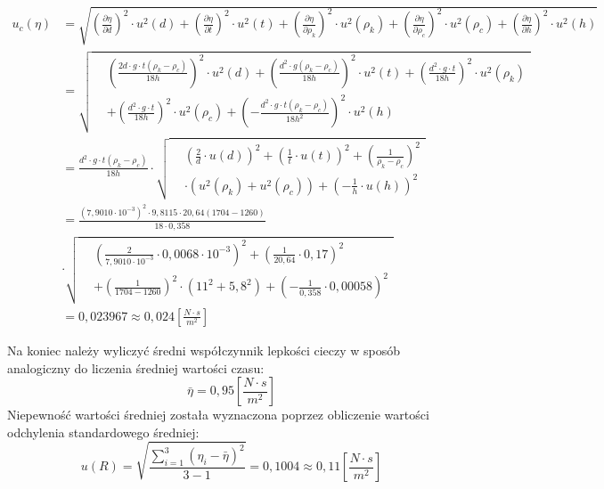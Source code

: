 \documentclass[polish, 11pt, a4paper]{article}
\begin{document}
		\begin{align*}
			u_c(\eta)	&=\sqrt{\left(\frac{\partial \eta}{\partial d}\right)^2\cdot u^2(d)
							+\left(\frac{\partial \eta}{\partial t}\right)^2\cdot u^2(t)
							+\left(\frac{\partial \eta}{\partial \rho_k}\right)^2\cdot u^2(\rho_k)
							+\left(\frac{\partial \eta}{\partial \rho_c}\right)^2\cdot u^2(\rho_c)
							+\left(\frac{\partial \eta}{\partial h}\right)^2\cdot u^2(h)}\\[10pt]
						&=\sqrt{
							\begin{aligned}
							&\left(\frac{2d\cdot g\cdot t(\rho_k-\rho_c)}{18h}\right)^2\cdot u^2(d)
								+\left(\frac{d^2\cdot g(\rho_k-\rho_c)}{18h}\right)^2\cdot u^2(t)
								+\left(\frac{d^2\cdot g\cdot t}{18h}\right)^2\cdot u^2(\rho_k)\\
							&+\left(\frac{d^2\cdot g\cdot t}{18h}\right)^2\cdot u^2(\rho_c)
								+\left(-\frac{d^2\cdot g\cdot t(\rho_k-\rho_c)}{18h^2}\right)^2\cdot u^2(h)
							\end{aligned}
						}\\[10pt]
						&=\frac{d^2\cdot g\cdot t(\rho_k-\rho_c)}{18h}\cdot
							\sqrt{
								\begin{aligned}
								&\left(\frac{2}{d}\cdot u(d)\right)^2 + \left(\frac{1}{t}\cdot u(t)\right)^2 + \left(\frac{1}{\rho_k-\rho_c}\right)^2\\
								&\cdot\left(u^2(\rho_k)+u^2(\rho_c)\right) + \left(-\frac{1}{h}\cdot u(h)\right)^2
								\end{aligned}
							}\\[10pt]
						&=\frac{(7,9010\cdot 10^{-3})^2\cdot 9,8115\cdot 20,64(1704-1260)}{18\cdot 0,358}\\
						&\cdot\sqrt{
							\begin{aligned}
							&\left(\frac{2}{7,9010\cdot 10^{-3}}\cdot 0,0068\cdot 10^{-3}\right)^2 + \left(\frac{1}{20,64}\cdot 0,17\right)^2\\
							&+ \left(\frac{1}{1704-1260}\right)^2\cdot\left(11^2+5,8^2\right) + \left(-\frac{1}{0,358}\cdot 0,00058\right)^2
							\end{aligned}
						}\\[10pt]
						&=0,023967\approx 0,024\left[\frac{N\cdot s}{m^2}\right]
		\end{align*}
		
		Na koniec należy wyliczyć średni współczynnik lepkości cieczy w sposób analogiczny do liczenia średniej wartości czasu:
		\begin{displaymath}
		\bar{\eta}=0,95\left[\frac{N\cdot s}{m^2}\right]
		\end{displaymath}
		Niepewność wartości średniej została wyznaczona poprzez obliczenie wartości odchylenia standardowego średniej:
		\begin{displaymath}
		u(R)=\sqrt{\frac{\sum_{i=1}^{3}(\eta_i-\bar{\eta})^2}{3-1}}=0,1004\approx 0,11\left[\frac{N\cdot s}{m^2}\right]
		\end{displaymath}
\end{document}
